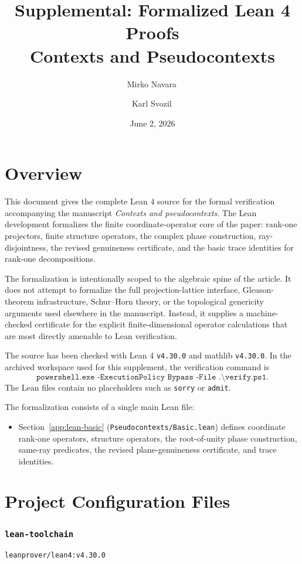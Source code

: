 \documentclass{article}
\title{Supplemental: Formalized Lean 4 Proofs\\
Contexts and Pseudocontexts}
\author{Mirko Navara\,\orcidlink{0000-0002-0880-5992}
\and Karl Svozil\,\orcidlink{0000-0001-6554-2802}}
\date{June 2, 2026}
\begin{document}
\maketitle

\section*{Overview}
This document gives the complete Lean 4 source for the formal verification
accompanying the manuscript \emph{Contexts and pseudocontexts}.  The Lean
development formalizes the finite coordinate-operator core of the paper:
rank-one projectors, finite structure operators, the complex phase
construction, ray-disjointness, the revised genuineness certificate, and the
basic trace identities for rank-one decompositions.

The formalization is intentionally scoped to the algebraic spine of the
article.  It does not attempt to formalize the full projection-lattice
interface, Gleason-theorem infrastructure, Schur--Horn theory, or the
topological genericity arguments used elsewhere in the manuscript.  Instead,
it supplies a machine-checked certificate for the explicit finite-dimensional
operator calculations that are most directly amenable to Lean verification.

The source has been checked with Lean 4 \texttt{v4.30.0} and mathlib
\texttt{v4.30.0}.  In the archived workspace used for this supplement, the
verification command is
\[
  \texttt{powershell.exe -ExecutionPolicy Bypass -File .\textbackslash verify.ps1}.
\]
The Lean files contain no placeholders such as \texttt{sorry} or
\texttt{admit}.

The formalization consists of a single main Lean file:
\begin{itemize}
  \item Section~\ref{app:lean-basic} (\texttt{Pseudocontexts/Basic.lean})
  defines coordinate rank-one operators, structure operators, the
  root-of-unity phase construction, same-ray predicates, the revised
  plane-genuineness certificate, and trace identities.
\end{itemize}

\newpage
\tableofcontents

\newpage
\section{Project Configuration Files}

\subsubsection*{\texttt{lean-toolchain}}
\begin{lstlisting}[language=lean, numbers=none]
leanprover/lean4:v4.30.0
\end{lstlisting}
\end{document}
